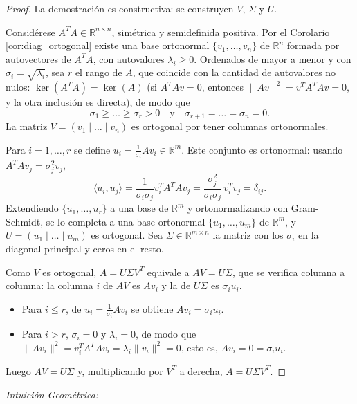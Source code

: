 \documentclass[11pt, a4paper]{article}
\begin{document}
\begin{proof}
La demostración es constructiva: se construyen $V$, $\Sigma$ y $U$.

Considérese $A^T A \in \mathbb{R}^{n \times n}$, simétrica y semidefinida positiva. Por el Corolario \ref{cor:diag_ortogonal} existe una base ortonormal $\{v_1, \dots, v_n\}$ de $\mathbb{R}^n$ formada por autovectores de $A^T A$, con autovalores $\lambda_i \ge 0$. Ordenados de mayor a menor y con $\sigma_i = \sqrt{\lambda_i}$, sea $r$ el rango de $A$, que coincide con la cantidad de autovalores no nulos: $\ker(A^T A) = \ker(A)$ (si $A^T A v = 0$, entonces $\|Av\|^2 = v^T A^T A v = 0$, y la otra inclusión es directa), de modo que
\[ \sigma_1 \ge \dots \ge \sigma_r > 0 \quad \text{y} \quad \sigma_{r+1} = \dots = \sigma_n = 0. \]
La matriz $V = (v_1 \mid \dots \mid v_n)$ es ortogonal por tener columnas ortonormales.

Para $i = 1, \dots, r$ se define $u_i = \frac{1}{\sigma_i} A v_i \in \mathbb{R}^m$. Este conjunto es ortonormal: usando $A^T A v_j = \sigma_j^2 v_j$,
\[ \langle u_i, u_j \rangle = \frac{1}{\sigma_i \sigma_j} v_i^T A^T A v_j = \frac{\sigma_j^2}{\sigma_i \sigma_j}\, v_i^T v_j = \delta_{ij}. \]
Extendiendo $\{u_1, \dots, u_r\}$ a una base de $\mathbb{R}^m$ y ortonormalizando con Gram-Schmidt, se lo completa a una base ortonormal $\{u_1, \dots, u_m\}$ de $\mathbb{R}^m$, y $U = (u_1 \mid \dots \mid u_m)$ es ortogonal. Sea $\Sigma \in \mathbb{R}^{m \times n}$ la matriz con los $\sigma_i$ en la diagonal principal y ceros en el resto.

Como $V$ es ortogonal, $A = U \Sigma V^T$ equivale a $A V = U \Sigma$, que se verifica columna a columna: la columna $i$ de $AV$ es $A v_i$ y la de $U \Sigma$ es $\sigma_i u_i$.
\begin{itemize}
    \item Para $i \le r$, de $u_i = \frac{1}{\sigma_i} A v_i$ se obtiene $A v_i = \sigma_i u_i$.
    \item Para $i > r$, $\sigma_i = 0$ y $\lambda_i = 0$, de modo que $\|A v_i\|^2 = v_i^T A^T A v_i = \lambda_i \|v_i\|^2 = 0$, esto es, $A v_i = 0 = \sigma_i u_i$.
\end{itemize}
Luego $A V = U \Sigma$ y, multiplicando por $V^T$ a derecha, $A = U \Sigma V^T$.
\end{proof}

\obs \textit{Intuición Geométrica:}
\end{document}
